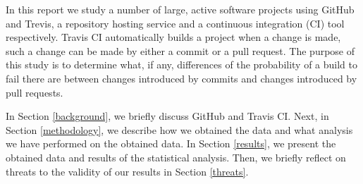 In this report we study a number of large, active software projects using GitHub and Trevis, a repository hosting service and a continuous integration (CI) tool respectively.
Travis CI automatically builds a project when a change is made, such a change can be made by either a commit or a pull request.
The purpose of this study is to determine what, if any, differences of the probability of a build to fail there are between changes introduced by commits and changes introduced by pull requests.


In Section \ref{background}, we briefly discuss GitHub and Travis CI.
Next, in Section \ref{methodology}, we describe how we obtained the data and what analysis we have performed on the obtained data.
In Section \ref{results}, we present the obtained data and results of the statistical analysis.
Then, we briefly reflect on threats to the validity of our results in Section \ref{threats}.
